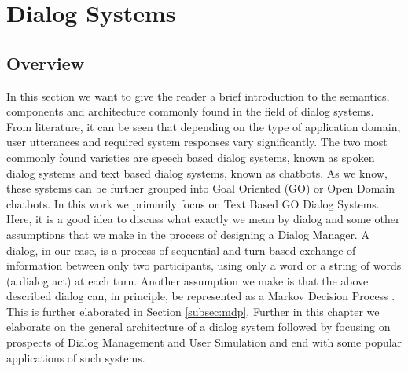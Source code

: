 \documentclass[14pt]{extarticle}
\numberwithin{equation}{section}
\begin{document}
	\section{Dialog Systems}
	\subsection{Overview}
	In this section we want to give the reader a brief introduction to the semantics, components and architecture commonly found in the field of dialog systems. From literature, it can be seen that depending on the type of application domain, user utterances and required system responses vary significantly. The two most commonly found varieties are speech based dialog systems, known as spoken dialog systems and text based dialog systems, known as chatbots. As we know, these systems can be further grouped into Goal Oriented (GO) or Open Domain chatbots. In this work we primarily focus on Text Based GO Dialog Systems. Here, it is a good idea to discuss what exactly we mean by dialog and some other assumptions that we make in the process of designing a Dialog Manager. A dialog, in our case, is a process of sequential and turn-based exchange of information between only two participants, using only a word or a string of words (a dialog act) at each turn. Another assumption we make is that the above described dialog can, in principle,  be represented as a Markov Decision Process \cite{mdp-pieraccini}. This is further elaborated in Section \ref{subsec:mdp}. Further in this chapter we elaborate on the general architecture of a dialog system followed by focusing on prospects of Dialog Management and User Simulation and end with some popular applications of such systems.
\end{document}
